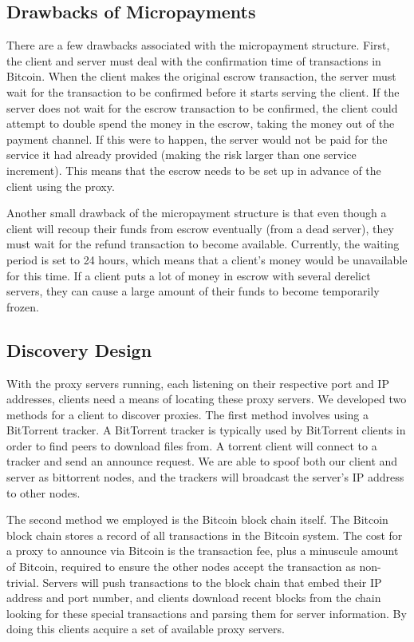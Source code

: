 \subsection{Drawbacks of Micropayments}

There are a few drawbacks associated with the micropayment structure. First, 
the client and server must deal with the confirmation time of transactions in Bitcoin. When the client makes the original escrow transaction, the server must wait for the transaction to be confirmed before it starts serving the client. If the server does not wait for the escrow transaction to be confirmed, the client could attempt to double spend the money in the escrow, taking the money out of the payment channel. If this were to happen, the server would not be paid for the service it had already provided (making the risk larger than one service increment). This means that the escrow needs to be set up in advance of the client using the proxy. 

Another small drawback of the micropayment structure is that even though a client will recoup their funds from escrow eventually (from a dead server), they must wait for the refund transaction to become available. Currently, the waiting period is set to 24 hours, which means that a client's money would be unavailable for this time. If a client puts a lot of money in escrow with several derelict servers, they can cause a large amount of their funds to become temporarily frozen.

\subsection{Discovery Design}
\label{sec:discovery}

With the proxy servers running, each listening on their respective port and IP addresses, clients need a means of locating these proxy servers. We developed two methods for a client to discover proxies. The first method involves using a BitTorrent tracker. A BitTorrent tracker is typically used by BitTorrent clients in order to find peers to download files from. A torrent client will connect to a tracker and send an announce request. We are able to spoof both our client and server as bittorrent nodes, and the trackers will broadcast the server's IP address to other nodes.

The second method we employed is the Bitcoin block chain itself. The Bitcoin block chain stores a record of all transactions in the Bitcoin system. The cost for a proxy to announce via Bitcoin is the transaction fee, plus a minuscule amount of Bitcoin, required to ensure the other nodes accept the transaction as non-trivial. Servers will push transactions to the block chain that embed their IP address and port number, and clients download recent blocks from the chain looking for these special transactions and parsing them for server information. By doing this clients acquire a set of available proxy servers.

